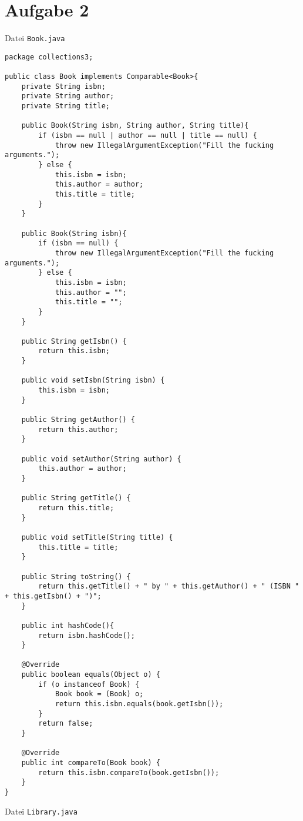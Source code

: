 \documentclass{article}
\begin{document}
	\section*{Aufgabe 2}
	Datei \texttt{Book.java}
	\begin{lstlisting}[style=java,tabsize=2]
package collections3;

public class Book implements Comparable<Book>{
	private String isbn;
	private String author;
	private String title;

	public Book(String isbn, String author, String title){
		if (isbn == null | author == null | title == null) {
			throw new IllegalArgumentException("Fill the fucking arguments.");
		} else {
			this.isbn = isbn;
			this.author = author;
			this.title = title;
		}
	}

	public Book(String isbn){
		if (isbn == null) {
			throw new IllegalArgumentException("Fill the fucking arguments.");
		} else {
			this.isbn = isbn;
			this.author = "";
			this.title = "";
		}
	}

	public String getIsbn() {
		return this.isbn;
	}

	public void setIsbn(String isbn) {
		this.isbn = isbn;
	}

	public String getAuthor() {
		return this.author;
	}

	public void setAuthor(String author) {
		this.author = author;
	}

	public String getTitle() {
		return this.title;
	}

	public void setTitle(String title) {
		this.title = title;
	}

	public String toString() {
		return this.getTitle() + " by " + this.getAuthor() + " (ISBN " + this.getIsbn() + ")";
	}

	public int hashCode(){
		return isbn.hashCode();
	}

	@Override
	public boolean equals(Object o) {
		if (o instanceof Book) {
			Book book = (Book) o;
			return this.isbn.equals(book.getIsbn());
		}
		return false;
	}

	@Override
	public int compareTo(Book book) {
		return this.isbn.compareTo(book.getIsbn());
	}
}
	\end{lstlisting}
	Datei \texttt{Library.java}
\end{document}

